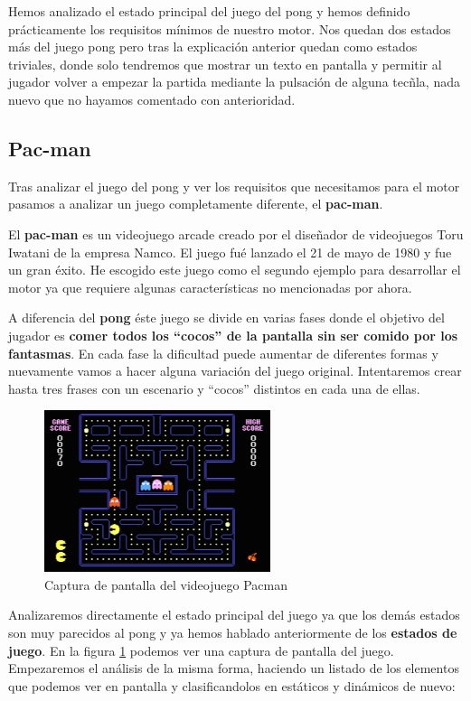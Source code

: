 \documentclass[a4paper]{article}
\begin{document}
Hemos analizado el estado principal del juego del pong y hemos definido prácticamente los requisitos mínimos de nuestro motor. Nos quedan dos estados más del juego pong pero tras la explicación anterior quedan como estados triviales, donde solo tendremos que mostrar un texto en pantalla y permitir al jugador volver a empezar la partida mediante la pulsación de alguna tecñla, nada nuevo que no hayamos comentado con anterioridad.

\subsection{Pac-man}

Tras analizar el juego del pong y ver los requisitos que necesitamos para el motor pasamos a analizar un juego completamente diferente, el \textbf{pac-man}.

El \textbf{pac-man} es un videojuego arcade creado por el diseñador de videojuegos Toru Iwatani de la empresa Namco. El juego fué lanzado el 21 de mayo de 1980 y fue un gran éxito.  He escogido este juego como el segundo ejemplo para desarrollar el motor ya que requiere algunas características no mencionadas por ahora.

A diferencia del \textbf{pong} éste juego se divide en varias fases donde el objetivo del jugador es \textbf{comer todos los ``cocos'' de la pantalla sin ser comido por los fantasmas}. En cada fase la dificultad puede aumentar de diferentes formas y nuevamente vamos a hacer alguna variación del juego original. Intentaremos crear hasta tres frases con un escenario y ``cocos'' distintos en cada una de ellas.

\begin{figure}[h]
  \begin{center}
    \includegraphics[width=250px]{images/pacman.png}
    \caption{Captura de pantalla del videojuego Pacman}
    \label{pacman}
  \end{center}
\end{figure}

Analizaremos directamente el estado principal del juego ya que los demás estados son muy parecidos al pong y ya hemos hablado anteriormente de los \textbf{estados de juego}. En la figura \ref{pacman} podemos ver una captura de pantalla del juego. Empezaremos el análisis de la misma forma, haciendo un listado de los elementos que podemos ver en pantalla y clasificandolos en estáticos y dinámicos de nuevo:
\end{document}
